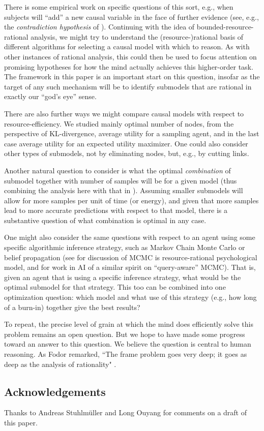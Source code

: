 \documentclass[10pt,letterpaper]{article}
\begin{document}
There is some empirical work on specific questions of this sort, e.g., when subjects will ``add'' a new causal variable in the face of further evidence (see, e.g., the \emph{contradiction hypothesis} of \citealt{Park}). Continuing with the idea of bounded-resource-rational analysis, we might try to understand the (resource-)rational basis of different algorithms for selecting a causal model with which to reason. As with other instances of rational analysis, this could then be used to focus attention on promising hypotheses for how the mind actually achieves this higher-order task. The framework in this paper is an important start on this question, insofar as the target of any such mechanism will be to identify submodels that are rational in exactly our ``god's eye'' sense.

There are also further ways we might compare causal models with respect to resource-efficiency. We studied mainly optimal number of nodes, from the perspective of KL-divergence, average utility for a sampling agent, and in the last case average utility for an expected utility maximizer. One could also consider other types of submodels, not by eliminating nodes, but, e.g., by cutting links.

Another natural question to consider is what the optimal \emph{combination} of submodel together with number of samples will be for a given model (thus combining the analysis here with that in \citealt{Vul2014}). Assuming smaller submodels will allow for more samples per unit of time (or energy), and given that more samples lead to more accurate predictions with respect to that model, there is a substantive question of what combination is optimal in any case.

One might also consider the same questions with respect to an agent using some specific algorithmic inference strategy, such as Markov Chain Monte Carlo or belief propagation (see \citealt{Griffiths2014} for discussion of MCMC is resource-rational psychological model, and \citealt{WickMcCallum} for work in AI of a similar spirit on ``query-aware'' MCMC). That is, given an agent that is using a specific inference strategy, what would be the optimal submodel for that strategy. This too can be combined into one optimization question: which model and what use of this strategy (e.g., how long of a burn-in) together give the best results?

To repeat, the precise level of grain at which the mind does efficiently solve this problem remains an open question. But we hope to have made some progress toward an answer to this question. We believe the question is central to  human reasoning. As Fodor remarked, ``The frame problem goes very deep; it goes as deep as the analysis of rationality" \citeyearpar{Fodor1987}.


\subsection{Acknowledgements} Thanks to Andreas Stuhlm\"{u}ller and Long Ouyang for comments on a draft of this paper.




\end{document}
